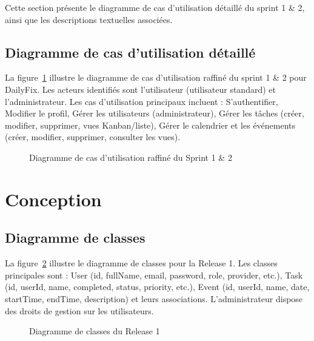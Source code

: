 Cette section présente le diagramme de cas d'utilisation détaillé du sprint 1 \& 2, ainsi que les descriptions textuelles associées.

\subsection{Diagramme de cas d'utilisation détaillé}

La figure~\ref{authCUgen18} illustre le diagramme de cas d'utilisation raffiné du sprint 1 \& 2 pour DailyFix. Les acteurs identifiés sont l'utilisateur (utilisateur standard) et l'administrateur. Les cas d'utilisation principaux incluent : S'authentifier, Modifier le profil, Gérer les utilisateurs (administrateur), Gérer les tâches (créer, modifier, supprimer, vues Kanban/liste), Gérer le calendrier et les événements (créer, modifier, supprimer, consulter les vues).

\begin{figure}[H]
\centering
\caption{Diagramme de cas d'utilisation raffiné du Sprint 1 \& 2}
\label{authCUgen18}
\end{figure}

\section{Conception}

\subsection{Diagramme de classes}

La figure~\ref{diagClasseR1} illustre le diagramme de classes pour la Release 1. Les classes principales sont : User (id, fullName, email, password, role, provider, etc.), Task (id, userId, name, completed, status, priority, etc.), Event (id, userId, name, date, startTime, endTime, description) et leurs associations. L'administrateur dispose des droits de gestion sur les utilisateurs.

\begin{figure}[H]
\centering
\caption{Diagramme de classes du Release 1}
\label{diagClasseR1}
\end{figure}

